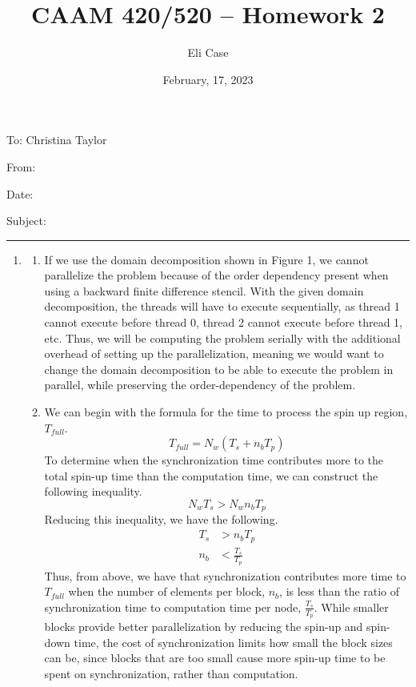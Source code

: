 \documentclass[11pt]{article}
\author{Eli Case}
\title{CAAM 420/520 -- Homework 2}
\date{February, 17, 2023}
\begin{document}
\flushleft
\thispagestyle{plain}
To: Christina Taylor

From: \@author

Date: \@date

Subject: \@title

\makeatother
\medskip
\hrule
\medskip

\begin{enumerate}[leftmargin=0.9in]
\item %

   \begin{enumerate}[leftmargin=0.3in]

      \item If we use the domain decomposition shown in Figure 1, we cannot parallelize the problem because of the order dependency present when using a backward finite difference stencil. With the given domain decomposition, the threads will have to execute sequentially, as thread 1 cannot execute before thread 0, thread 2 cannot execute before thread 1, etc. Thus, we will be computing the problem serially with the additional overhead of setting up the parallelization, meaning we would want to change the domain decomposition to be able to execute the problem in parallel, while preserving the order-dependency of the problem.

      \item We can begin with the formula for the time to process the spin up region, $T_{full}$.
        \begin{equation}
           T_{full} = N_w(T_s + n_bT_p)
        \end{equation}
        To determine when the synchronization time contributes more to the total spin-up time than the computation time, we can construct the following inequality.
        \begin{equation}
           N_wT_s > N_wn_bT_p 
        \end{equation}
        Reducing this inequality, we have the following.
        \begin{align*}
          T_s &> n_bT_p \\
          n_b &< \frac{T_s}{T_p}
        \end{align*}
        Thus, from above, we have that synchronization contributes more time to $T_{full}$ when the number of elements per block, $n_b$, is less than the ratio of synchronization time to computation time per node, $\frac{T_s}{T_p}$. While smaller blocks provide better parallelization by reducing the spin-up and spin-down time, the cost of synchronization limits how small the block sizes can be, since blocks that are too small cause more spin-up time to be spent on synchronization, rather than computation. 
 

\end{enumerate}
\end{enumerate}
\end{document}
